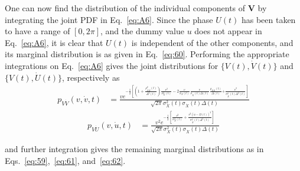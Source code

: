 \documentclass{article}
\begin{document}
One can now find the distribution of the individual components of $\mathbf{V}$
by integrating the joint PDF in Eq.~\eqref{eq:A6}. Since the phase $U (t)$ has
been taken to have a range of $[0, 2 \pi]$, and the dummy value $u$ does not
appear in Eq.~\eqref{eq:A6}, it is clear that $U (t)$ is independent of the
other components, and its marginal distribution is as given in
Eq.~\eqref{eq:60}. Performing the appropriate integrations on
Eq.~\eqref{eq:A6} gives the joint distributions for $\{V (t), \dot{V} (t)\}$
and $\{V (t), \dot{U} (t)\}$, respectively as
\begin{equation}
  \begin{array}{ll}
    p_{V \dot{V}} (v, \dot{v}, t) & = \frac{v e^{- \frac{1}{2}  \left[ \left(
    1 + \frac{\rho_{X \dot{X}}^2 (t)}{\Delta^2 (t)} \right) 
    \frac{v^2}{\sigma_X^2 (t)} - 2 \frac{v}{\sigma_X (t)} 
    \frac{\dot{v}}{\sigma_{\dot{X}} (t) \Delta (t)}  \frac{\rho_{X \dot{X}}
    (t)}{\Delta (t)} \right. \left. + \frac{\dot{v}^2}{\sigma_{\dot{X}}^2 (t)
    \Delta^2 (t)} \right]}}{\sqrt{2 \pi} \sigma_X^2 (t) \sigma_{\dot{X}} (t)
    \Delta (t)} 
  \end{array} \label{eq:A7}
\end{equation}
\begin{align}
  p_{V \dot{U}} (v, \dot{u}, t) & = \frac{v^2 e^{- \frac{1}{2}  \left[
  \frac{v^2}{\sigma_X^2 (t)} + \frac{v^2 (\dot{u} - \Omega
  (t))^2}{\sigma_{\dot{X}}^2 (t) \Delta^2 (t)} \right]}}{\sqrt{2 \pi}
  \sigma_X^2 (t) \sigma_{\dot{X}} (t) \Delta (t)}   \label{eq:A8}
\end{align}

and further integration gives the remaining marginal distributions as in
Eqs.~\eqref{eq:59},~\eqref{eq:61}, and~\eqref{eq:62}.
\end{document}
